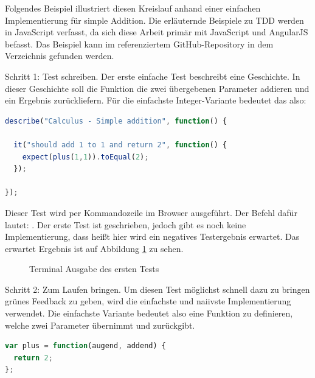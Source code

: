 Folgendes Beispiel illustriert diesen Kreislauf anhand einer einfachen Implementierung für simple Addition.
Die erläuternde Beispiele zu TDD werden in JavaScript verfasst, da sich diese Arbeit primär mit JavaScript und AngularJS befasst.
Das Beispiel kann im referenziertem GitHub-Repository in dem Verzeichnis  gefunden werden.

Schritt 1: Test schreiben.
Der erste einfache Test beschreibt eine Geschichte. In dieser Geschichte soll die Funktion  die zwei übergebenen Parameter addieren und ein Ergebnis zurückliefern. Für die einfachste Integer-Variante bedeutet das also: 

\begin{lstlisting}[language=JavaScript]
describe("Calculus - Simple addition", function() {

  it("should add 1 to 1 and return 2", function() {
    expect(plus(1,1)).toEqual(2);
  });

});
\end{lstlisting}

Dieser Test wird per Kommandozeile im Browser  ausgeführt. Der Befehl dafür lautet: . Der erste Test ist geschrieben, jedoch gibt es noch keine Implementierung, dass heißt hier wird ein negatives Testergebnis erwartet. Das erwartet Ergebnis ist auf Abbildung \ref{figure:tdd-simple-step-1-1} zu sehen.

\begin{figure}[H]
  \centering
  \caption{Terminal Ausgabe des ersten Tests}
  \label{figure:tdd-simple-step-1-1}
\end{figure}

Schritt 2: Zum Laufen bringen.
Um diesen Test möglichst schnell dazu zu bringen grünes Feedback zu geben, wird die einfachste und naiivste Implementierung verwendet.
Die einfachste Variante bedeutet also eine Funktion zu definieren, welche zwei Parameter übernimmt und \glqq{2\grqq} zurückgibt.

\begin{lstlisting}[language=JavaScript]
var plus = function(augend, addend) {
  return 2;
};
\end{lstlisting}

